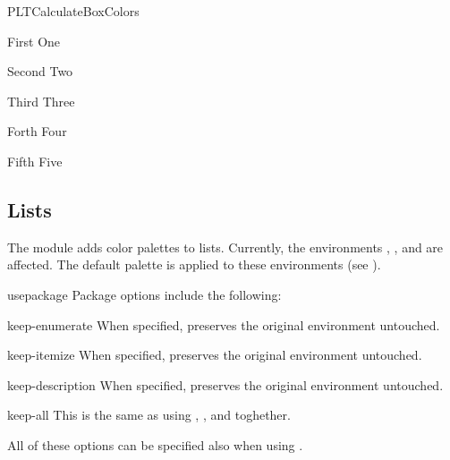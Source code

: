 \documentclass[a4paper, 11pt]{article}
\begin{document}
\begin{macrodef}{PLTCalculateBoxColors}{}
\begin{example}{}
        \begin{PLTBoxRaster}[box 2, palette = orange blue]
            \item [First] One
            \item [Second] Two
            \item [Third] Three
            \item [Forth] Four
            \item [Fifth] Five
        \end{PLTBoxRaster}
    \end{example}
\end{macrodef}

\subsection{Lists}\label{sec:itemizer}

The module  adds color palettes to lists. Currently, the environments , , and  are affected. The default palette is applied to these environments (see ).

\begin{macro*}{usepackage}{}
    Package options include the following:

    \begin{optiondef}{keep-enumerate}{}{}
        When specified,  preserves the original  environment untouched.
    \end{optiondef}

    \begin{optiondef}{keep-itemize}{}{}
        When specified,  preserves the original  environment untouched.
    \end{optiondef}

    \begin{optiondef}{keep-description}{}{}
        When specified,  preserves the original  environment untouched.
    \end{optiondef}

    \begin{optiondef}{keep-all}{}{}
        This is the same as using , , and  toghether.
    \end{optiondef}

    All of these options can be specified also when using \latexinline{\usepackage{palettize}}.
\end{macro*}
\end{document}
